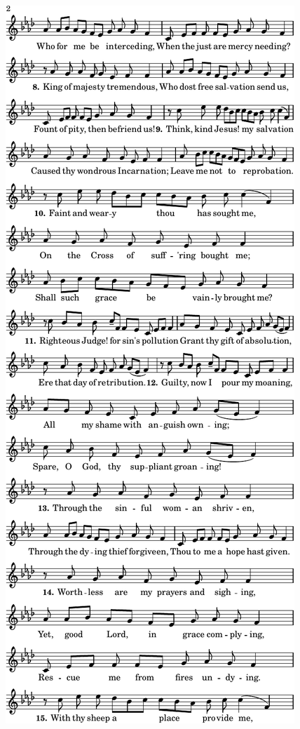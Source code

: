 \includegraphics{Day of wrath (DIES IRAE)-Melody-2}%
\ifx\betweenLilyPondSystem \undefined
  \linebreak
\else
  \expandafter{}%
\fi
